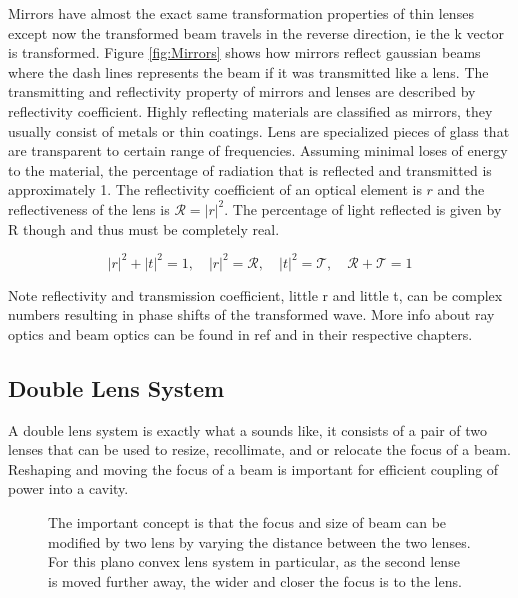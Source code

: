 \documentclass[a4paper]{book}
\newcommand{\imginput}[1]{} %
\begin{document}
		Mirrors have almost the exact same transformation properties of thin lenses except now the transformed beam travels in the reverse direction, ie the k vector is transformed. 
		Figure \ref{fig:Mirrors} shows how mirrors reflect gaussian beams where the dash lines represents the beam if it was transmitted like a lens.
		The transmitting and reflectivity property of mirrors and lenses are described by reflectivity coefficient. 
		Highly reflecting materials are classified as mirrors, they usually consist of metals or thin coatings. 
		Lens are specialized pieces of glass that are transparent to certain range of frequencies.
		Assuming minimal loses of energy to the material, the percentage of radiation that is reflected and transmitted is approximately 1. 
		The reflectivity coefficient of an optical element is $r$ and the reflectiveness of the lens is $\mathcal{R}=|r|^2$. The percentage of light reflected is given by R though and thus must be completely real.
		
		\begin{equation}\label{reflectivity}
			|r|^2+|t|^2=1, \quad |r|^2=\mathcal{R}, \quad |t|^2=\mathcal{T}, \quad \mathcal{R}+\mathcal{T}=1
		\end{equation}
		
		Note reflectivity and transmission coefficient, little r and little t, can be complex numbers resulting in phase shifts of the transformed wave. More info about ray optics and beam optics can be found in ref\cite{SalehTeichs} and \cite{steck} in their respective chapters.
		
		\subsection{Double Lens System}
			\label{subsec:Double Lens System}
			A double lens system is exactly what a sounds like, it consists of a pair of two lenses that can be used to resize, recollimate, and or relocate the focus of a beam. Reshaping and moving the focus of a beam is important for efficient coupling of power into a cavity.
			
			\begin{figure} [!ht]
				\centering
				\def\svgwidth{\columnwidth}
				\resizebox{160mm}{!}{\imginput{images/double-lens-system.pdf_tex}}
				\caption{The important concept is that the focus and size of beam can be modified by two lens by varying the distance between the two lenses. For this plano convex lens system in particular, as the second lense is moved further away, the wider and closer the focus is to the lens.
				}
				\label{fig:double-lens-system}
			\end{figure}
\end{document}
